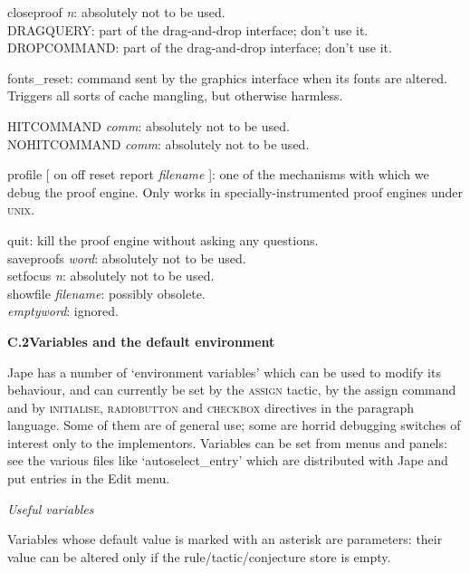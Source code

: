 \documentclass[11pt]{book}
\newcommand{\tab}{\hspace{5mm}}
\begin{document}
closeproof \textit{n}: absolutely not to be used.\\
DRAGQUERY: part of the drag-and-drop interface; don't use it.\\
DROPCOMMAND: part of the drag-and-drop interface; don't use it.


fonts\_reset: command sent by the graphics interface when its fonts are altered. Triggers all sorts of cache mangling, but otherwise harmless.


HITCOMMAND \textit{comm}: absolutely not to be used.\\
NOHITCOMMAND \textit{comm}: absolutely not to be used.


profile [ on {\textbar} off {\textbar} reset {\textbar} report \textit{filename} ]: one of the mechanisms with which we debug the proof engine. Only works in specially-instrumented proof engines under \textsc{unix}.


quit: kill the proof engine without asking any questions.\\
saveproofs \textit{word}: absolutely not to be used.\\
setfocus \textit{n}: absolutely not to be used.\\
showfile \textit{filename}: possibly obsolete.\\
\textit{emptyword}: ignored.


\textbf{{\large C.2\tab Variables and the default environment}}


Jape has a number of `environment variables' which can be used to modify its behaviour, and can currently be set by the \textsc{assign} tactic, by the assign command and by \textsc{initialise, radiobutton} and \textsc{checkbox} directives in the paragraph language. Some of them are of general use; some are horrid debugging switches of interest only to the implementors. Variables can be set from menus and panels: see the various files like `autoselect\_entry' which are distributed with Jape and put entries in the Edit menu.


\textit{Useful variables}


Variables whose default value is marked with an asterisk are parameters: their value can be altered only if the rule/tactic/conjecture store is empty.\\
\end{document}
